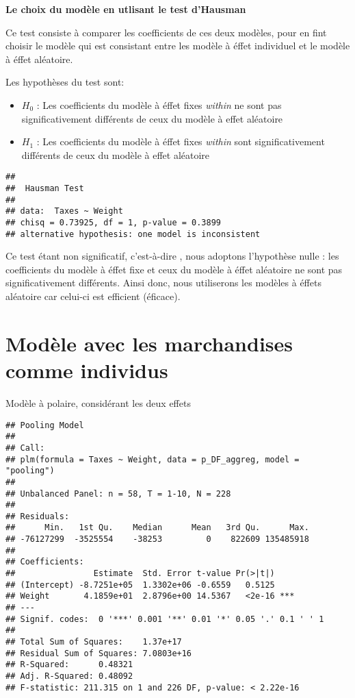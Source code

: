 \documentclass[
]{book}
\providecommand{\tightlist}{%
  \setlength{\itemsep}{0pt}\setlength{\parskip}{0pt}}
\begin{document}
\textbf{Le choix du modèle en utlisant le test d'Hausman}

Ce test consiste à comparer les coefficients de ces deux modèles, pour en fint choisir le modèle qui est consistant entre les modèle à éffet individuel et le modèle à éffet aléatoire.

Les hypothèses du test sont:

\begin{itemize}
\tightlist
\item
  \(H_0\) : Les coefficients du modèle à éffet fixes \emph{within} ne sont pas significativement différents de ceux du modèle à effet aléatoire
\item
  \(H_1\) : Les coefficients du modèle à éffet fixes \emph{within} sont significativement différents de ceux du modèle à effet aléatoire
\end{itemize}

\begin{verbatim}
## 
##  Hausman Test
## 
## data:  Taxes ~ Weight
## chisq = 0.73925, df = 1, p-value = 0.3899
## alternative hypothesis: one model is inconsistent
\end{verbatim}

Ce test étant non significatif, c'est-à-dire , nous adoptons l'hypothèse nulle : les coefficients du modèle à éffet fixe et ceux du modèle à éffet aléatoire ne sont pas significativement différents. Ainsi donc, nous utiliserons les modèles à éffets aléatoire car celui-ci est efficient (éficace).

\hypertarget{moduxe8le-avec-les-marchandises-comme-individus}{%
\section{Modèle avec les marchandises comme individus}\label{moduxe8le-avec-les-marchandises-comme-individus}}

Modèle à polaire, considérant les deux effets

\begin{verbatim}
## Pooling Model
## 
## Call:
## plm(formula = Taxes ~ Weight, data = p_DF_aggreg, model = "pooling")
## 
## Unbalanced Panel: n = 58, T = 1-10, N = 228
## 
## Residuals:
##      Min.   1st Qu.    Median      Mean   3rd Qu.      Max. 
## -76127299  -3525554    -38253         0    822609 135485918 
## 
## Coefficients:
##                Estimate  Std. Error t-value Pr(>|t|)    
## (Intercept) -8.7251e+05  1.3302e+06 -0.6559   0.5125    
## Weight       4.1859e+01  2.8796e+00 14.5367   <2e-16 ***
## ---
## Signif. codes:  0 '***' 0.001 '**' 0.01 '*' 0.05 '.' 0.1 ' ' 1
## 
## Total Sum of Squares:    1.37e+17
## Residual Sum of Squares: 7.0803e+16
## R-Squared:      0.48321
## Adj. R-Squared: 0.48092
## F-statistic: 211.315 on 1 and 226 DF, p-value: < 2.22e-16
\end{verbatim}
\end{document}
